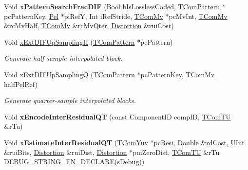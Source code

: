 \begin{DoxyCompactItemize}
\item 
\mbox{\label{class_t_enc_search_ab9c82fbfd7d91177a23ef76435d72c50}} 
Void {\bfseries x\+Pattern\+Search\+Frac\+D\+IF} (Bool b\+Is\+Lossless\+Coded, \hyperlink{class_t_com_pattern}{T\+Com\+Pattern} $\ast$pc\+Pattern\+Key, \hyperlink{_type_def_8h_af92141699657699b4b547be0c8517541}{Pel} $\ast$pi\+RefY, Int i\+Ref\+Stride, \hyperlink{class_t_com_mv}{T\+Com\+Mv} $\ast$pc\+Mv\+Int, \hyperlink{class_t_com_mv}{T\+Com\+Mv} \&rc\+Mv\+Half, \hyperlink{class_t_com_mv}{T\+Com\+Mv} \&rc\+Mv\+Qter, \hyperlink{_type_def_8h_aed82b23ef6849d0bc3d95c92102d5b50}{Distortion} \&rui\+Cost)
\item 
Void \hyperlink{class_t_enc_search_a019d17f625b726f411f7fd36559b8db2}{x\+Ext\+D\+I\+F\+Up\+SamplingH} (\hyperlink{class_t_com_pattern}{T\+Com\+Pattern} $\ast$pc\+Pattern)
\begin{DoxyCompactList}\small\item\em Generate half-\/sample interpolated block. \end{DoxyCompactList}\item 
Void \hyperlink{class_t_enc_search_a72f639ab83aa97205773779742132706}{x\+Ext\+D\+I\+F\+Up\+SamplingQ} (\hyperlink{class_t_com_pattern}{T\+Com\+Pattern} $\ast$pc\+Pattern\+Key, \hyperlink{class_t_com_mv}{T\+Com\+Mv} half\+Pel\+Ref)
\begin{DoxyCompactList}\small\item\em Generate quarter-\/sample interpolated blocks. \end{DoxyCompactList}\item 
\mbox{\label{class_t_enc_search_a18a292a165cd0ab5264c817eebb7f061}} 
Void {\bfseries x\+Encode\+Inter\+Residual\+QT} (const Component\+ID comp\+ID, \hyperlink{class_t_com_t_u}{T\+Com\+TU} \&r\+Tu)
\item 
\mbox{\label{class_t_enc_search_ac8702d95afdc05c0eea72945cc1f4383}} 
Void {\bfseries x\+Estimate\+Inter\+Residual\+QT} (\hyperlink{class_t_com_yuv}{T\+Com\+Yuv} $\ast$pc\+Resi, Double \&rd\+Cost, U\+Int \&rui\+Bits, \hyperlink{_type_def_8h_aed82b23ef6849d0bc3d95c92102d5b50}{Distortion} \&rui\+Dist, \hyperlink{_type_def_8h_aed82b23ef6849d0bc3d95c92102d5b50}{Distortion} $\ast$pui\+Zero\+Dist, \hyperlink{class_t_com_t_u}{T\+Com\+TU} \&r\+Tu D\+E\+B\+U\+G\+\_\+\+S\+T\+R\+I\+N\+G\+\_\+\+F\+N\+\_\+\+D\+E\+C\+L\+A\+RE(s\+Debug))
\item 

\end{DoxyCompactItemize}
